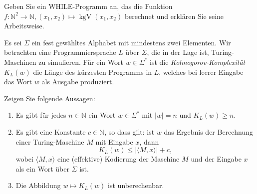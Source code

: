 \documentclass[german]{latteachCD}[2017/03/28]
\begin{document}
\begin{exercise}
  Geben Sie ein WHILE-Programm an, das die Funktion $f \colon \mathbb N^{2} \to
  \mathbb N, (x_{1}, x_{2}) \mapsto \operatorname{kgV}(x_{1}, x_{2})$
  berechnet und erklären Sie seine Arbeitsweise.
\end{exercise}

\begin{exercise}
  Es sei $\Sigma$ ein fest gewähltes Alphabet mit mindestens zwei Elementen.
  Wir betrachten eine Programmiersprache $L$ über $\Sigma$, die in der Lage ist,
  Turing-Maschinen zu simulieren.  Für ein Wort $w \in \Sigma^{*}$ ist die
  \emph{Kolmogorov-Komplexität} $K_{L}(w)$ die Länge des kürzesten Programms in
  $L$, welches bei leerer Eingabe das Wort $w$ als Ausgabe produziert.

  Zeigen Sie folgende Aussagen:
  \begin{enumerate}
  \item Es gibt für jedes $n \in \mathbb N$ ein Wort $w \in
    \Sigma^{*}$ mit $\lvert w\rvert = n$ und $K_{L}(w) \geq n$.
  \item Es gibt eine Konstante $c \in \mathbb N$, so dass gilt: ist $w$ das
    Ergebnis der Berechnung einer Turing-Maschine $M$ mit Eingabe $x$, dann
    \begin{equation*}
      K_{L}(w) \leq \lvert\langle M,x\rangle\rvert + c,
    \end{equation*}
    wobei $\langle M,x\rangle$ eine (effektive) Kodierung der Maschine $M$ und
    der Eingabe $x$ als ein Wort über $\Sigma$ ist.
  \item Die Abbildung $w \mapsto K_{L}(w)$ ist unberechenbar.
  \end{enumerate}

\end{exercise}
\end{document}
